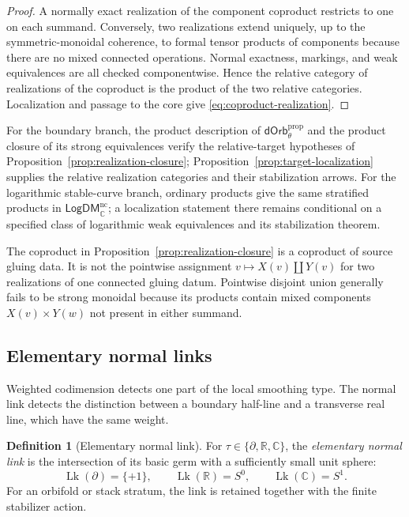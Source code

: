 \documentclass[11pt,letterpaper,twoside]{article}
\theoremstyle{plain}
\theoremstyle{definition}
\newtheorem{definition}[theorem]{Definition}
\theoremstyle{remark}
\newcommand{\dOrb}{\mathsf{dOrb}}
\begin{document}
\begin{proof}
A normally exact realization of the component coproduct restricts to one on each summand.  Conversely, two realizations extend uniquely, up to the symmetric-monoidal coherence, to formal tensor products of components because there are no mixed connected operations.  Normal exactness, markings, and weak equivalences are all checked componentwise.  Hence the relative category of realizations of the coproduct is the product of the two relative categories.  Localization and passage to the core give \eqref{eq:coproduct-realization}.
\end{proof}

For the boundary branch, the product description of \(\dOrb_\theta^{\mathrm{prop}}\) and the product closure of its strong equivalences verify the relative-target hypotheses of Proposition~\ref{prop:realization-closure}; Proposition~\ref{prop:target-localization} supplies the relative realization categories and their stabilization arrows.  For the logarithmic stable-curve branch, ordinary products give the same stratified products in \(\mathsf{LogDM}_{\mathbb C}^{\mathrm{nc}}\); a localization statement there remains conditional on a specified class of logarithmic weak equivalences and its stabilization theorem.

The coproduct in Proposition~\ref{prop:realization-closure} is a coproduct of source gluing data.  It is not the pointwise assignment \(v\mapsto X(v)\amalg Y(v)\) for two realizations of one connected gluing datum.  Pointwise disjoint union generally fails to be strong monoidal because its products contain mixed components \(X(v)\times Y(w)\) not present in either summand.

\subsection{Elementary normal links}

Weighted codimension detects one part of the local smoothing type.  The normal link detects the distinction between a boundary half-line and a transverse real line, which have the same weight.

\begin{definition}[Elementary normal link]\label{def:normal-link}
For \(\tau\in\{\partial,\mathbb R,\mathbb C\}\), the \emph{elementary normal link} is the intersection of its basic germ with a sufficiently small unit sphere:
\begin{equation}\label{eq:elementary-normal-links}
 \operatorname{Lk}(\partial)=\{+1\},
 \qquad
 \operatorname{Lk}(\mathbb R)=S^0,
 \qquad
 \operatorname{Lk}(\mathbb C)=S^1.
\end{equation}
For an orbifold or stack stratum, the link is retained together with the finite stabilizer action.
\end{definition}
\end{document}
